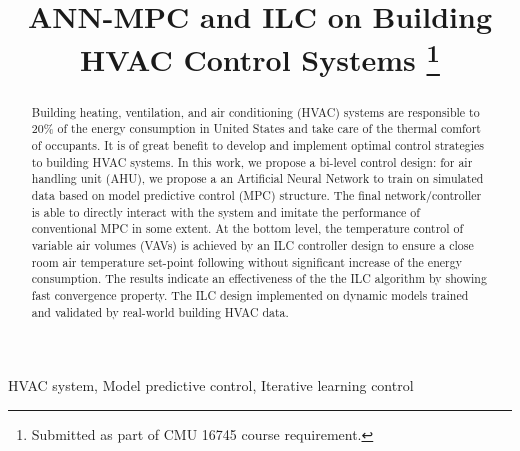 \documentclass[conference]{IEEEtran}
\begin{document}
\title{ANN-MPC and ILC on Building HVAC Control Systems
\thanks{Submitted as part of CMU 16745 course requirement.}
}

\author{
\and
{}
}

\maketitle

\begin{abstract}
Building heating, ventilation, and air conditioning (HVAC) systems are responsible to 20\% of the energy consumption in United States and take care of the thermal comfort of occupants.  It is of great benefit to develop and implement optimal control strategies to building HVAC systems. In this work, we propose a bi-level control design: for air handling unit (AHU), we propose a an Artificial Neural Network to train on simulated data based on model predictive control (MPC) structure. The final network/controller is able to directly interact with the system and imitate the performance of conventional MPC in some extent. At the bottom level, the temperature control of variable air volumes (VAVs) is achieved by an ILC controller design to ensure a close room air temperature set-point following without significant increase of the energy consumption. The results indicate an effectiveness of the the ILC algorithm by showing fast convergence property. The ILC design implemented on dynamic models trained and validated by real-world building HVAC data.
\end{abstract}

\begin{IEEEkeywords}
HVAC system, Model predictive control, Iterative learning control
\end{IEEEkeywords}
\end{document}
